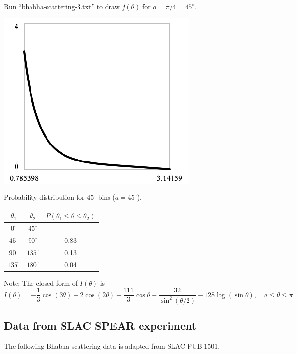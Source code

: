 \documentclass[12pt]{article}
\begin{document}
\noindent
Run ``bhabha-scattering-3.txt'' to draw $f(\theta)$ for $a=\pi/4=45^\circ$.

\begin{center}
\includegraphics[scale=0.5]{bhabha-scattering.png}
\end{center}

\noindent
Probability distribution for $45^\circ$ bins ($a=45^\circ$).
\begin{center}
\begin{tabular}{|c|c|c|}
\hline
$\theta_1$ & $\theta_2$ & $P(\theta_1\le\theta\le\theta_2)$\\
\hline
$0^\circ$ & $45^\circ$ & -- \\
$45^\circ$ & $90^\circ$ & 0.83 \\
$90^\circ$ & $135^\circ$ & 0.13 \\
$135^\circ$ & $180^\circ$ & 0.04 \\
\hline
\end{tabular}
\end{center}

\noindent
Note: The closed form of $I(\theta)$ is
\begin{equation*}
I(\theta)=-\frac{1}{3}\cos(3\theta)
-2\cos(2\theta)
-\frac{111}{3}\cos\theta
-\frac{32}{\sin^2(\theta/2)}
-128\log(\sin\theta),
\quad a\le\theta\le\pi
\end{equation*}

\subsection*{Data from SLAC SPEAR experiment}
\noindent
The following Bhabha scattering data is adapted from SLAC-PUB-1501.
\end{document}
